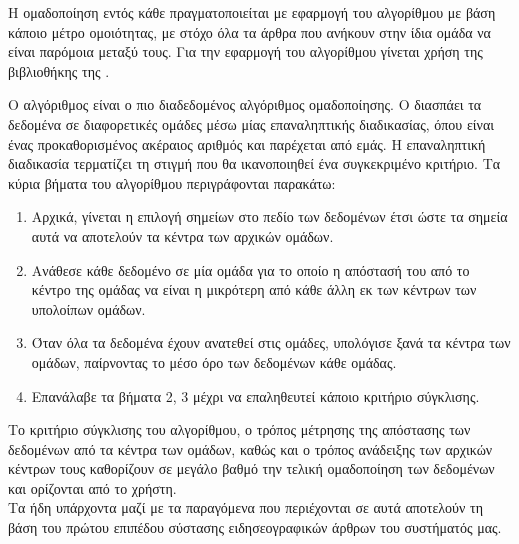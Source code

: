 {{{{{{%
H ομαδοποίηση εντός κάθε {} πραγματοποιείται με εφαρμογή του αλγορίθμου {} με βάση κάποιο μέτρο ομοιότητας, 
με στόχο όλα τα άρθρα που ανήκουν στην ίδια ομάδα να είναι παρόμοια μεταξύ τους. 
Για την εφαρμογή του αλγορίθμου γίνεται χρήση της βιβλιοθήκης {} της {}. \\

\par O αλγόριθμος \textbf{{}} \cite{Km01} είναι ο πιο διαδεδομένος αλγόριθμος ομαδοποίησης. 
O {} διασπάει τα δεδομένα σε {} διαφορετικές ομάδες μέσω μίας επαναληπτικής διαδικασίας, 
όπου {} είναι ένας προκαθορισμένος ακέραιος αριθμός και παρέχεται από εμάς. 
Η επαναληπτική διαδικασία τερματίζει τη στιγμή που θα ικανοποιηθεί ένα συγκεκριμένο κριτήριο. 
Τα κύρια βήματα του αλγορίθμου περιγράφονται παρακάτω: 

\begin{enumerate}
 \item Αρχικά, γίνεται η επιλογή {} σημείων στο πεδίο των δεδομένων έτσι ώστε τα σημεία αυτά 
 να αποτελούν τα κέντρα των αρχικών ομάδων. 
 \item Ανάθεσε κάθε δεδομένο σε μία ομάδα για το οποίο η απόστασή του από το κέντρο της ομάδας να είναι 
 η μικρότερη από κάθε άλλη εκ των κέντρων των υπολοίπων ομάδων. 
 \item Όταν όλα τα δεδομένα έχουν ανατεθεί στις ομάδες, υπολόγισε ξανά τα κέντρα των ομάδων, παίρνοντας 
 το μέσο όρο των δεδομένων κάθε ομάδας. 
 \item Επανάλαβε τα βήματα 2, 3 μέχρι να επαληθευτεί κάποιο κριτήριο σύγκλισης.
\end{enumerate}

Το κριτήριο σύγκλισης του αλγορίθμου, ο τρόπος μέτρησης της απόστασης των δεδομένων από τα κέντρα των ομάδων, 
καθώς και ο τρόπος ανάδειξης των αρχικών κέντρων τους καθορίζουν σε μεγάλο βαθμό την τελική ομαδοποίηση των δεδομένων 
και ορίζονται από το χρήστη. \\



Τα ήδη υπάρχοντα {} μαζί με τα παραγόμενα {} που περιέχονται σε αυτά 
αποτελούν τη βάση του πρώτου επιπέδου σύστασης ειδησεογραφικών άρθρων του συστήματός μας. 

}}}}}}
